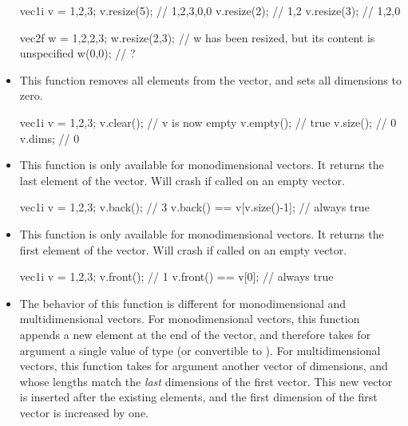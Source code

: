 \documentclass[12pt]{report}
\newenvironment{example}
{
    \begin{mdframed}[style=example,frametitle={Example}]
}
{
    \end{mdframed}
}
\begin{document}
\begin{itemize}
\begin{example}
\begin{cppcode}
vec1i v = {1,2,3};
v.resize(5); // {1,2,3,0,0}
v.resize(2); // {1,2}
v.resize(3); // {1,2,0}

vec2f w = {{1,2},{2,3}};
w.resize(2,3); // w has been resized, but its content is unspecified
w(0,0); // ?
\end{cppcode}
\end{example}

\item {}

This function removes all elements from the vector, and sets all dimensions to zero.

\begin{example}
\begin{cppcode}
vec1i v = {1,2,3};
v.clear(); // v is now empty
v.empty(); // true
v.size();  // 0
v.dims;    // {0}
\end{cppcode}
\end{example}

\item {}

This function is only available for monodimensional vectors. It returns the last element of the vector. Will crash if called on an empty vector.

\begin{example}
\begin{cppcode}
vec1i v = {1,2,3};
v.back(); // 3
v.back() == v[v.size()-1]; // always true
\end{cppcode}
\end{example}

\item {}

This function is only available for monodimensional vectors. It returns the first element of the vector. Will crash if called on an empty vector.

\begin{example}
\begin{cppcode}
vec1i v = {1,2,3};
v.front(); // 1
v.front() == v[0]; // always true
\end{cppcode}
\end{example}

\item {}

The behavior of this function is different for monodimensional and multidimensional vectors. For monodimensional vectors, this function appends a new element at the end of the vector, and therefore takes for argument a single value of type  (or convertible to ). For multidimensional vectors, this function takes for argument another vector of  dimensions, and whose lengths match the \emph{last}  dimensions of the first vector. This new vector is inserted after the existing elements, and the first dimension of the first vector is increased by one.


\end{itemize}
\end{document}
